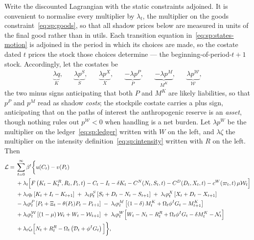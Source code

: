  Write the discounted Lagrangian with the static constraints
adjoined. It is convenient to normalise every multiplier by $\lambda_t$, the multiplier on the goods
constraint~\eqref{eq:sp:goods}, so that all shadow prices below are measured in units of the final
good rather than in utils. Each transition equation in~\eqref{eq:sp:states-motion} is adjoined in the period in which its choices are made, so the costate dated $t$ prices the stock those choices determine --- the beginning-of-period-$t{+}1$ stock. Accordingly, let the costates be
\begin{align}
\underbrace{\lambda q}_{K},
&&
\underbrace{\lambda p^S}_{S},
&&
\underbrace{\lambda p^X}_{X},
&&
\underbrace{-\lambda p^P}_{P},
&&
\underbrace{-\lambda p^M}_{M^K},
&&
\underbrace{\lambda p^{\mathcal W}}_{\mathcal W},
\label{eq:sp:costates-def}
\end{align}
the two minus signs anticipating that both $P$ and $M^K$ are likely liabilities, so that $p^P$ and $p^M$ read as shadow \emph{costs}; the stockpile costate carries a plus sign, anticipating that on the paths of interest the anthropogenic reserve is an \emph{asset}, though nothing rules out $p^{\mathcal W}<0$ when handling is a net burden. Let $\lambda p^W$ be the multiplier on the ledger~\eqref{eq:sp:ledger} written with $W$ on the left, and $\lambda\zeta$ the multiplier on the intensity definition~\eqref{eq:sp:intensity} written with
$R$ on the left. Then
\begin{align}
\mathcal L
={}& \sum_{t=0}^{\infty}\beta^t\bigg\{ u(C_t)-v(P_t)
\notag\\
&+\lambda_t\Big[F\left(K_t-K^R_t,R_t,P_t,t\right)-C_t-I_t-\delta K_t-C^N(N_t,S_t,t)-C^D(D_t,X_t,t)-c^W\!\left(\varpi_t,t\right)\mu\mathcal W_t\Big]
\notag\\
&+\lambda_t q_t\left[K_t+I_t-K_{t+1}\right]
\;+\;\lambda_t p^S_t\left[S_t+D_t-N_t-S_{t+1}\right]
\;+\;\lambda_t p^X_t\left[X_t+D_t-X_{t+1}\right]
\notag\\
&-\lambda_t p^P_t\left[P_t+\Xi_t-\theta(P_t)P_t-P_{t+1}\right]
\;-\;\lambda_t p^M_t\left[\left(1-\delta\right)M^K_t+\Omega_t\phi^IG_t-M^K_{t+1}\right]
\notag\\
&+\lambda_t p^{\mathcal W}_t\left[\left(1-\mu\right)\mathcal W_t+W_t-\mathcal W_{t+1}\right]
\;+\;\lambda_t p^W_t\Big[W_t-N_t-R^R_t+\Omega_t\phi^IG_t-\delta M^K_t-\mathcal N_t\Big]
\notag\\
&+\lambda_t \zeta_t\Big[N_t+R^R_t-\Omega_t\left(\mathcal D_t+\phi^IG_t\right)\Big]\bigg\},
\label{eq:sp:lagrangian}
\end{align}
